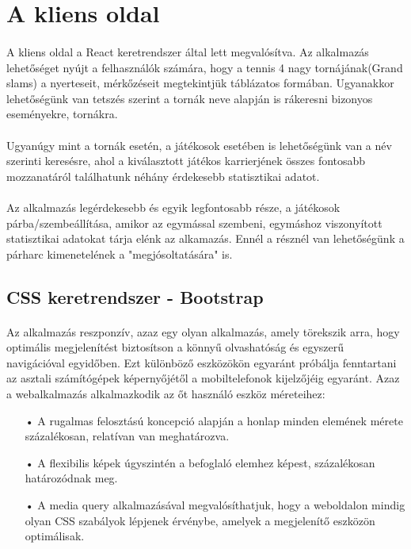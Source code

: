 \section{A kliens oldal}
\paragraph{}
A kliens oldal a  React keretrendszer által lett megvalósítva. Az alkalmazás lehetőséget nyújt a felhasználók számára, hogy a tennis 4 nagy tornájának(Grand slams) a nyerteseit, mérkőzéseit megtekintjük táblázatos formában. Ugyanakkor lehetőségünk van tetszés szerint a tornák neve alapján is rákeresni bizonyos eseményekre, tornákra. 
\paragraph{}
Ugyanúgy mint a tornák esetén, a játékosok esetében is lehetőségünk van a név szerinti keresésre, ahol a kiválasztott játékos karrierjének összes fontosabb mozzanatáról találhatunk néhány érdekesebb statisztikai adatot.
\paragraph{}
Az alkalmazás legérdekesebb és egyik legfontosabb része, a játékosok párba/szembeállítása, amikor az egymással szembeni, egymáshoz viszonyított statisztikai adatokat tárja elénk az alkamazás. Ennél a résznél van lehetőségünk a párharc kimenetelének a "megjósoltatására" is.

\subsection{CSS keretrendszer - Bootstrap}
\paragraph{}
Az alkalmazás reszponzív, azaz egy olyan alkalmazás, amely törekszik arra, hogy optimális megjelenítést biztosítson a könnyű olvashatóság és egyszerű navigációval egyidőben. Ezt különböző eszközökön egyaránt próbálja fenntartani az asztali számítógépek képernyőjétől a mobiltelefonok kijelzőjéig egyaránt. Azaz a webalkalmazás alkalmazkodik az őt használó eszköz méreteihez:
\begin{enumerate}
\item[•] A rugalmas felosztású koncepció alapján a honlap minden elemének mérete százalékosan, relatívan van meghatározva.
\item[•] A flexibilis képek úgyszintén a befoglaló elemhez képest, százalékosan határozódnak meg.
\item[•] A media query alkalmazásával megvalósíthatjuk, hogy a weboldalon mindig olyan CSS szabályok lépjenek érvénybe, amelyek a megjelenítő eszközön optimálisak.
\end{enumerate}

